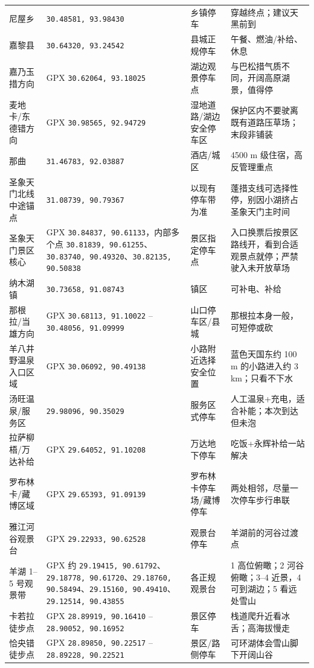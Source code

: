 \documentclass[10.5pt,a4paper]{ctexart}
\newcommand{\coord}[2]{\texttt{#1, #2}}
\begin{document}
\begin{longtable}{p{3.4cm}p{3.6cm}p{4.0cm}p{5.1cm}}
尼屋乡 & \coord{30.48581}{93.98430} & 乡镇停车 & 穿越终点；建议天黑前到 \\
嘉黎县 & \coord{30.64320}{93.24542} & 县城正规停车 & 午餐、燃油/补给、休息 \\
嘉乃玉措方向 & GPX \coord{30.62064}{93.18025} & 湖边观景停车点 & 与巴松措气质不同，开阔高原湖景，值得停 \\
麦地卡/东德错方向 & GPX \coord{30.98565}{92.94729} & 湿地道路/湖边安全停车区 & 保护区内不要驶离既有道路压草场；末段非铺装 \\
那曲 & \coord{31.46783}{92.03887} & 酒店/城区 & 4500 m 级住宿，高反管理重点 \\
圣象天门北线中途锚点 & \coord{31.08739}{90.79367} & 以现有停车带为准 & 蓬措支线可选择性停，别因小湖挤占圣象天门主时间 \\
圣象天门景区核心 & GPX \coord{30.84837}{90.61133}，内部多个点 \coord{30.81839}{90.61255}、\coord{30.83740}{90.49320}、\coord{30.82135}{90.50838} & 景区指定停车点 & 入口换票后按景区路线开，看到合适观景点就停；严禁驶入未开放草场 \\
纳木湖镇 & \coord{30.73658}{91.08743} & 镇区 & 可补电、补给 \\
那根拉/当雄方向 & GPX \coord{30.68113}{91.10022} -- \coord{30.48056}{91.09999} & 山口停车区/县城 & 那根拉本身一般，可短停或砍 \\
羊八井野温泉入口区域 & GPX \coord{30.06092}{90.49138} & 小路附近选择安全位置 & 蓝色天国东约 100 m 的小路进入约 3 km；只看不下水 \\
汤旺温泉/服务区 & \coord{29.98096}{90.35029} & 服务区式停车 & 人工温泉+充电，适合补能；本次到达但未泡 \\
拉萨柳梧/万达补给 & GPX \coord{29.64052}{91.10208} & 万达地下停车 & 吃饭+永辉补给一站解决 \\
罗布林卡/藏博区域 & GPX \coord{29.65393}{91.09139} & 罗布林卡停车场/藏博停车 & 两处相邻，尽量一次停车步行串联 \\
雅江河谷观景台 & GPX \coord{29.22933}{90.62528} & 观景台停车 & 羊湖前的河谷过渡点 \\
羊湖 1--5 号观景带 & GPX 约 \coord{29.19415}{90.61792}、\coord{29.18778}{90.61720}、\coord{29.18760}{90.58494}、\coord{29.15160}{90.49410}、\coord{29.12514}{90.43855} & 各正规观景台 & 1 高位俯瞰；2 河谷俯瞰；3--4 近景，4 可到湖边；5 看远处雪山 \\
卡若拉徒步点 & GPX \coord{28.89919}{90.16410} -- \coord{28.90052}{90.16952} & 景区停车 & 栈道爬升近看冰舌；高海拔慢走 \\
恰央错徒步点 & GPX \coord{28.89850}{90.22517} -- \coord{28.89228}{90.22521} & 景区/路侧停车 & 可环湖体会雪山脚下开阔山谷 \\

\end{longtable}
\end{document}
